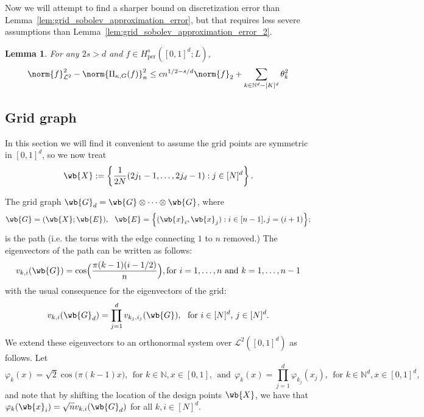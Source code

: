 \documentclass{article}
\newcommand{\set}[1]{\left\{#1\right\}}
\newcommand{\1}{\mathbf{1}}
\newcommand{\Nbb}{\mathbb{N}}
\newcommand{\Leb}{\mathcal{L}}
\theoremstyle{alden}
\theoremstyle{aldenthm}
\newtheorem{lemma}{Lemma}
\theoremstyle{definition}
\theoremstyle{remark}
\begin{document}
Now we will attempt to find a sharper bound on discretization error than Lemma~\ref{lem:grid_sobolev_approximation_error}, but that requires less severe assumptions than Lemma~\ref{lem:grid_sobolev_approximation_error_2}.
\begin{lemma}
	\label{lem:grid_sobolev_approximation_error_3}
	For any $2s > d$ and $f \in H_{\textrm{per}}^s([0,1]^d;L)$, 
	\begin{equation*}
	\norm{f}_{\Leb^2}^2 - \norm{\Pi_{\kappa,G}(f)}_{n}^2 \leq c n^{1/2 - s/d} \norm{f}_2 + \sum_{k \in \mathbb{N}^d - [K]^d} \theta_k^2
	\end{equation*}
\end{lemma}

\subsection{Grid graph}
In this section we will find it convenient to assume the grid points are symmetric in $[0,1]^d$, so we now treat
\begin{equation*}
\wb{X} := \set{\frac{1}{2N}(2j_1 - 1,\ldots,2j_d - 1): j \in [N]^d}.
\end{equation*}

The grid graph $\wb{G}_d = \wb{G} \otimes \cdots \otimes \wb{G}$, where
\begin{equation*}
\wb{G} = (\wb{X}; \wb{E}),~~ \wb{E} = \Bigl\{(\wb{x}_i,\wb{x}_j): i \in [n - 1], j = (i + 1)\Bigr\}; 
\end{equation*}
is the path (i.e. the torus with the edge connecting $1$ to $n$ removed.) The eigenvectors of the path can be written as follows:
\begin{equation*}
v_{k,i}(\wb{G}) = \cos\Bigl(\frac{\pi (k - 1) (i - 1/2)}{n}\Bigr), \textrm{for $i = 1,\ldots,n$ and $k = 1,\ldots,n - 1$}
\end{equation*}
with the usual consequence for the eigenvectors of the grid:
\begin{equation*}
v_{k,i}(\wb{G}_d) = \prod_{j = 1}^d v_{k_j,i_j}(\wb{G}),~~ \textrm{for $i \in [N]^d$, $j \in [N]^d$.}
\end{equation*}
We extend these eigenvectors to an orthonormal system over $\Leb^2([0,1]^d)$ as follows. Let
\begin{equation*}
\varphi_k(x) = \sqrt{2}\cos\biggl(\pi (k - 1) x\biggr),~~\textrm{for $k \in \Nbb, x \in [0,1]$},~~\textrm{and}~~ \varphi_k(x) = \prod_{j = 1}^{d} \varphi_{k_j}(x_j),~~\textrm{for $k \in \Nbb^d, x \in [0,1]^d$},
\end{equation*}
and note that by shifting the location of the design points $\wb{X}$, we have that $\varphi_k(\wb{x}_i) = \sqrt{n} v_{k,i}(\wb{G}_d)$ for all $k,i \in [N]^d$.
\end{document}
